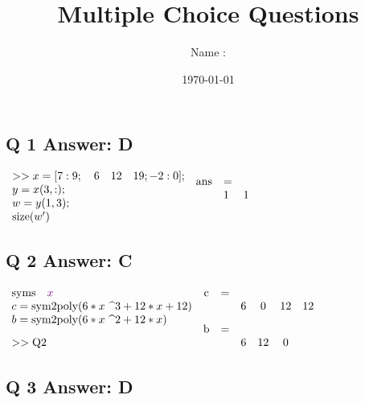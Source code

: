 \documentclass[a4paper,11pt]{article}
\title{Multiple Choice Questions}
\author{Name :}
\date{\today}
\begin{document}
 


\maketitle


\subsection*{Q 1 Answer: D}

\(\begin{array}{l}
    >> x=[7:9; \quad 6 \quad 12 \quad 19;-2:0]; \\
    y=x(3,:); \\
    w=y(1,3); \\
    \text{size}(w^\prime)
\end{array} \\ [5mm]
\begin{array}{lll} 
    \text{ans} & = & \\
        & 1 & 1 \\ [5mm]
       
\end{array}\)

\subsection*{Q 2 Answer: C}

\(
\begin{array}{l}
     \text{syms} \quad \color{violet} x \\
     c = \text{sym2poly}(6*x\text{ \textasciicircum }3 + 12*x + 12) \\
     b = \text{sym2poly}(6*x\text{ \textasciicircum }2 + 12*x)\\ [3mm]
     >> \text{Q2}
\end{array} \\ [2mm]
\begin{array}{cccccc}
       \text{c} & = & & && \\
        & & 6 & 0 & 12 & 12 \\ [3mm]
      \text{b} & = & & && \\
        & & 6 & 12 & 0 &   
\end{array}
\)


\clearpage

\subsection*{Q 3 Answer: D}
\end{document}
